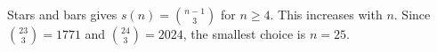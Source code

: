 Stars and bars gives $s(n)=\binom{n-1}{3}$ for $n\ge4$. This increases with $n$. Since $\binom{23}{3}=1771$ and $\binom{24}{3}=2024$, the smallest choice is $\boxed{n=25}$.
